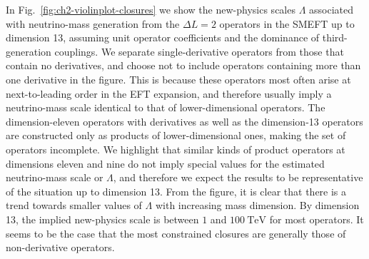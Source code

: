 In Fig.~\ref{fig:ch2-violinplot-closures} we show the new-physics scales $\Lambda$
associated with neutrino-mass generation from the $\Delta L = 2$ operators in
the SMEFT up to dimension 13, assuming unit operator coefficients and the
dominance of third-generation couplings. We separate single-derivative operators
from those that contain no derivatives, and choose not to include operators
containing more than one derivative in the figure. This is because these
operators most often arise at next-to-leading order in the EFT expansion, and
therefore usually imply a neutrino-mass scale identical to that of
lower-dimensional operators. The dimension-eleven operators with derivatives as
well as the dimension-13 operators are constructed only as products of
lower-dimensional ones, making the set of operators incomplete. We highlight
that similar kinds of product operators at dimensions eleven and nine do not
imply special values for the estimated neutrino-mass scale or $\Lambda$, and
therefore we expect the results to be representative of the situation up to
dimension 13. From the figure, it is clear that there is a trend towards smaller
values of $\Lambda$ with increasing mass dimension. By dimension 13, the implied
new-physics scale is between $1$ and $100~\text{TeV}$ for most operators. It
seems to be the case that the most constrained closures are generally those of
non-derivative operators.

